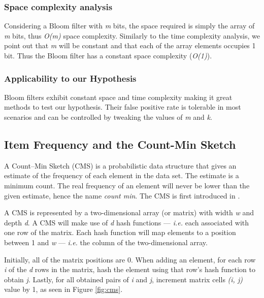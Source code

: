 \subsubsection{Space complexity analysis}
Considering a Bloom filter with \textit{m} bits, the space required is simply the array of \textit{m} bits, thus \textit{O(m)} space complexity. Similarly to the time complexity analysis, we point out that \textit{m} will be constant and that each of the array elements occupies 1 bit. Thus the Bloom filter has a constant space complexity (\textit{O(1)}).

\subsubsection{Applicability to our Hypothesis}
Bloom filters exhibit constant space and time complexity making it great methods to test our hypothesis. Their false positive rate is tolerable in most scenarios and can be controlled by tweaking the values of \textit{m} and \textit{k}.

\subsection{Item Frequency and the Count-Min Sketch}

A Count–Min Sketch (CMS) is a probabilistic data structure that gives an estimate of the frequency of each element in the data set. The estimate is a minimum count. The real frequency of an element will never be lower than the given estimate, hence the name \textit{count min}. The CMS is first introduced in \cite{Cormode-CMS}. 

A CMS is represented by a two-dimensional array (or matrix) with width \textit{w} and depth \textit{d}. A CMS will make use of \textit{d} hash functions --- \textit{i.e.} each associated with one row of the matrix. Each hash function will map elements to a position between 1 and \textit{w} --- \textit{i.e.} the column of the two-dimensional array.

Initially, all of the matrix positions are 0. When adding an element, for each row \textit{i} of the \textit{d} rows in the matrix, hash the element using that row's hash function to obtain \textit{j}. Lastly, for all obtained pairs of \textit{i} and \textit{j}, increment matrix cells \textit{(i, j)} value by 1, as seen in Figure \ref{fig:cms}.

